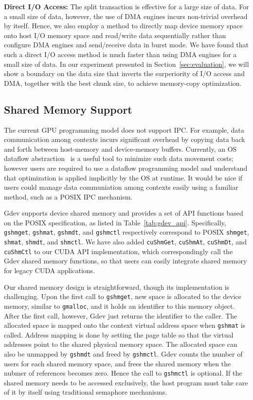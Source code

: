 \textbf{Direct I/O Access:}
The split transaction is effective for a large size of data.
For a small size of data, however, the use of DMA engines incurs
non-trivial overhead by itself.
Hence, we also employ a method to directly map device memory space onto
host I/O memory space and read/write data sequentially rather than
configure DMA engines and send/receive data in burst mode.
We have found that such a direct I/O access method is much faster than
using DMA engines for a small size of data.
In our experiment presented in Section~\ref{sec:evaluation}, we will
show a boundary on the data size that inverts the surperiority of I/O
access and DMA, together with the best chunk size, to achieve
memory-copy optimization.

\subsection{Shared Memory Support}
\label{sec:shared_memory}

The current GPU programming model does not support IPC.
For example, data communication among contexts incurs significant
overhead by copying data back and forth between host-memory and
device-memory buffers.
Currently, an OS dataflow abstraction~\cite{Rossbach_SOSP11} is a useful
tool to minimize such data movement costs; however users are required to
use a dataflow programming model and understand that optimization is
applied implicitly by the OS at runtime.
It would be nice if users could manage data communiation among contexts
easily using a familiar method, such as a POSIX IPC mechanism.

Gdev supports device shared memory and provides a set of API
functions based on the POSIX specification, as listed in
Table~\ref{tab:gdev_api}.
Specifically, \texttt{gshmget}, \texttt{gshmat}, \texttt{gshmdt}, and
\texttt{gshmctl} respectively correspond to POSIX \texttt{shmget},
\texttt{shmat}, \texttt{shmdt}, and \texttt{shmctl}. 
We have also added \texttt{cuShmGet}, \texttt{cuShmAt},
\texttt{cuShmDt}, and \texttt{cuShmCtl} to our CUDA API 
implementation, which correspondingly call the Gdev shared memory
functions, so that users can easily integrate shared memory for legacy
CUDA applications.

Our shared memory design is straightforward, though its implementation
is challenging.
Upon the first call to \texttt{gshmget}, new space is allocated to the
device memory, similar to \texttt{gmalloc}, and it holds an identifier
to this memory object. 
After the first call, however, Gdev just returns the identifier to the
caller.
The allocated space is mapped onto the context virtual address space
when \texttt{gshmat} is called.
Address mapping is done by setting the page table so that the virtual
addresses point to the shared physical memory space.
The allocated space can also be unmapped by \texttt{gshmdt} and freed by
\texttt{gshmctl}. 
Gdev counts the number of users for each shared memory space,
and frees the shared memory when the nubmer of references becomes zero.
Hence the call to \texttt{gshmctl} is optional.
If the shared memory needs to be accessed exclusively, the host program
must take care of it by itself using traditional semaphore mechanisms.

